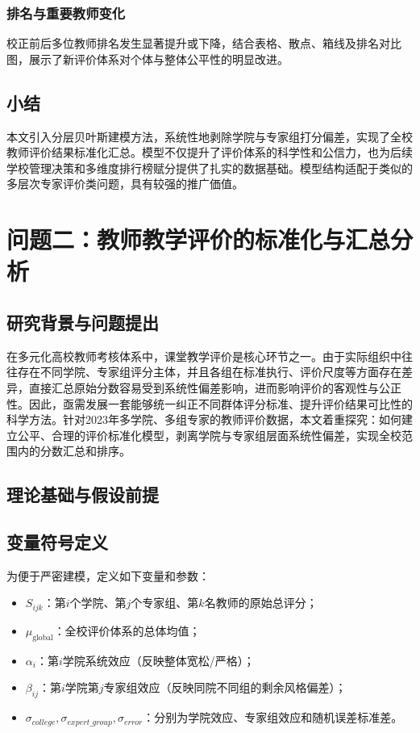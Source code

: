 \subsubsection{排名与重要教师变化}
校正前后多位教师排名发生显著提升或下降，结合表格、散点、箱线及排名对比图，展示了新评价体系对个体与整体公平性的明显改进。

\subsection{小结}
本文引入分层贝叶斯建模方法，系统性地剥除学院与专家组打分偏差，实现了全校教师评价结果标准化汇总。模型不仅提升了评价体系的科学性和公信力，也为后续学校管理决策和多维度排行榜赋分提供了扎实的数据基础。模型结构适配于类似的多层次专家评价类问题，具有较强的推广価值。







\section{问题二：教师教学评价的标准化与汇总分析}

\subsection{研究背景与问题提出}
在多元化高校教师考核体系中，课堂教学评价是核心环节之一。由于实际组织中往往存在不同学院、专家组评分主体，并且各组在标准执行、评价尺度等方面存在差异，直接汇总原始分数容易受到系统性偏差影响，进而影响评价的客观性与公正性。因此，亟需发展一套能够统一纠正不同群体评分标准、提升评价结果可比性的科学方法。针对2023年多学院、多组专家的教师评价数据，本文着重探究：如何建立公平、合理的评价标准化模型，剥离学院与专家组层面系统性偏差，实现全校范围内的分数汇总和排序。

\subsection{理论基础与假设前提}

\subsection{变量符号定义}
为便于严密建模，定义如下变量和参数：
\begin{itemize}
    \item $S_{ijk}$：第$i$个学院、第$j$个专家组、第$k$名教师的原始总评分；
    \item $\mu_{\text{global}}$：全校评价体系的总体均值；
    \item $\alpha_i$：第$i$学院系统效应（反映整体宽松/严格）；
    \item $\beta_{ij}$：第$i$学院第$j$专家组效应（反映同院不同组的剩余风格偏差）；
    \item $\sigma_{college}, \sigma_{expert\_group}, \sigma_{error}$：分别为学院效应、专家组效应和随机误差标准差。
\end{itemize}

